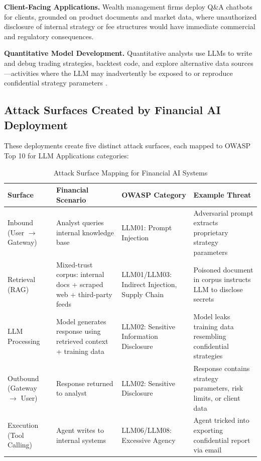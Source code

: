 \documentclass[12pt,a4paper]{article}
\begin{document}
\textbf{Client-Facing Applications.} Wealth management firms deploy Q\&A chatbots for clients, grounded on product documents and market data, where unauthorized disclosure of internal strategy or fee structures would have immediate commercial and regulatory consequences.

\textbf{Quantitative Model Development.} Quantitative analysts use LLMs to write and debug trading strategies, backtest code, and explore alternative data sources---activities where the LLM may inadvertently be exposed to or reproduce confidential strategy parameters \cite{stockbench}.

\subsection{Attack Surfaces Created by Financial AI Deployment}

These deployments create five distinct attack surfaces, each mapped to OWASP Top 10 for LLM Applications \cite{owasp_llm_2025} categories:

\begin{table}[H]
\centering
\caption{Attack Surface Mapping for Financial AI Systems}
\label{tab:attack_surface}
\small
\begin{tabular}{p{2.5cm}p{4cm}p{3cm}p{3.5cm}}
\toprule
\textbf{Surface} & \textbf{Financial Scenario} & \textbf{OWASP Category} & \textbf{Example Threat} \\
\midrule
Inbound (User $\rightarrow$ Gateway) & Analyst queries internal knowledge base & LLM01: Prompt Injection & Adversarial prompt extracts proprietary strategy parameters \\
\midrule
Retrieval (RAG) & Mixed-trust corpus: internal docs + scraped web + third-party feeds & LLM01/LLM03: Indirect Injection, Supply Chain & Poisoned document in corpus instructs LLM to disclose secrets \\
\midrule
LLM Processing & Model generates response using retrieved context + training data & LLM02: Sensitive Information Disclosure & Model leaks training data resembling confidential strategies \\
\midrule
Outbound (Gateway $\rightarrow$ User) & Response returned to analyst & LLM02: Sensitive Disclosure & Response contains strategy parameters, risk limits, or client data \\
\midrule
Execution (Tool Calling) & Agent writes to internal systems & LLM06/LLM08: Excessive Agency & Agent tricked into exporting confidential report via email \\
\bottomrule
\end{tabular}
\end{table}
\end{document}

